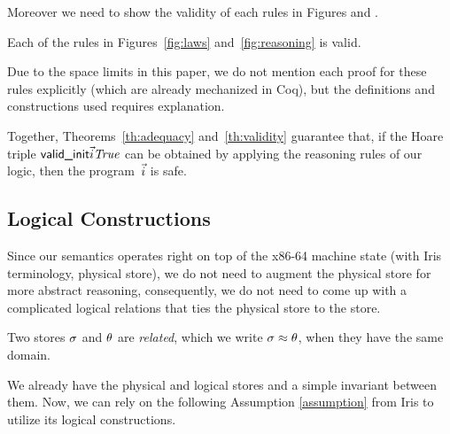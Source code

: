 Moreover we need to show the validity of each rules in Figures  and .
\begin{theorem}
\label{th:validity}
  Each of the rules in Figures~\ref{fig:laws}
  and~\ref{fig:reasoning} is valid.
\end{theorem}
Due to the space limits in this paper, we do not mention each proof for these rules explicitly (which are already mechanized in Coq),
but the definitions and constructions used requires explanation.

Together, Theorems~\ref{th:adequacy} and~\ref{th:validity} guarantee that, if
the Hoare triple $\textsf{valid\_init}\vec{i}\mathit{True}$ can be obtained by applying
the reasoning rules of our logic, then the program~$\vec{i}$ is safe.

\subsection{Logical Constructions}
\label{sec:invariant}

Since our semantics operates right on top of the x86-64 machine state (with Iris terminology, physical store),
we do not need to augment the physical store for more abstract reasoning, consequently, we do not need to come up
with a complicated logical relations that ties the physical store to the
\logical store. 
\begin{definition}
\label{def:related}
  Two stores $\sigma$ and $\theta$ are \emph{related},
  which we write $\sigma\approx\theta$, when
  they have the same domain.
\end{definition}

We already have the physical and logical stores and a simple invariant between them. Now, we can rely on the following Assumption \ref{assumption} from Iris to utilize its logical constructions.
\newcommand{\genheapinterp}[1]{\mathit{Heap}\;#1}
\newcommand{\pred}[1]{\ownGhost\gammaPred{\authfull{(\mapone\predstore)}}}
\newcommand{\mapone}[1]{1.#1}
\newcommand{\mapsfromexact}[3]{
  \ownGhost\gammaPred{\authfrag{\singletonMap{#1}{(#2, #3)}}}
}
\newcommand{\sh}{L'}
\newcommand{\mapsfromdef}[3]{
  \exists\sh.\;
  \mapsfromexact{#1}{#2}{\sh} \star \pure{\sh \subseteq #3}
}


